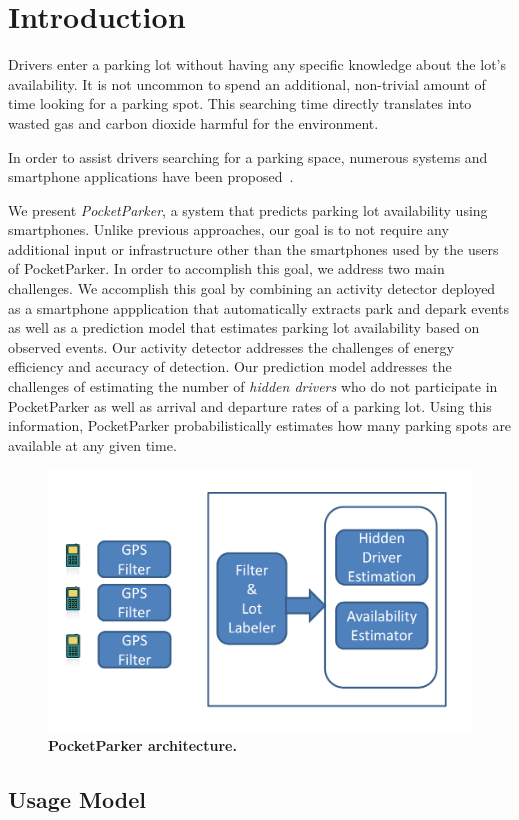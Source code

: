 \section{Introduction}

Drivers enter a parking lot without having any specific knowledge about the
lot's availability. It is not uncommon to spend an additional, non-trivial
amount of time looking for a parking spot. This searching time directly
translates into wasted gas and carbon dioxide harmful for the environment.

In order to assist drivers searching for a parking space, numerous systems and
smartphone applications have been proposed~\cite{Mathur:2010:PDS, 5062057,
Delot:2009:CRP, Chen:2012:COS, 4212497, open-spot}. 

We present {\it PocketParker}, a system that predicts parking lot availability
using smartphones. Unlike previous approaches, our goal is to not require any
additional input or infrastructure other than the smartphones used by the users
of PocketParker. In order to accomplish this goal, we address two main
challenges. We accomplish this goal by combining an activity detector
deployed as a smartphone appplication that automatically extracts park and
depark events as well as a prediction model that estimates parking lot
availability based on observed events. Our activity detector addresses the
challenges of energy efficiency and accuracy of detection. Our prediction model
addresses the challenges of estimating the number of {\it hidden drivers} who do
not participate in PocketParker as well as arrival and departure rates of a
parking lot. Using this information, PocketParker probabilistically estimates
how many parking spots are available at any given time.

\begin{figure}
\centering
\includegraphics[width=\columnwidth]{./figures/blockdiagram.pdf}

\caption{\textbf{PocketParker architecture.}}

\label{fig-arch}
\end{figure}

\subsection{Usage Model}
